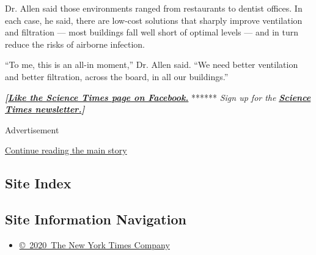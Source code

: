 Dr. Allen said those environments ranged from restaurants to dentist
offices. In each case, he said, there are low-cost solutions that
sharply improve ventilation and filtration --- most buildings fall well
short of optimal levels --- and in turn reduce the risks of airborne
infection.

``To me, this is an all-in moment,'' Dr. Allen said. ``We need better
ventilation and better filtration, across the board, in all our
buildings.''

\textbf{\emph{{[}}\href{http://on.fb.me/1paTQ1h}{\emph{Like the Science
Times page on Facebook.}}} ****** \emph{\textbar{} Sign up for the}
\textbf{\href{http://nyti.ms/1MbHaRU}{\emph{Science Times
newsletter.}}\emph{{]}}}

Advertisement

\protect\hyperlink{after-bottom}{Continue reading the main story}

\hypertarget{site-index}{%
\subsection{Site Index}\label{site-index}}

\hypertarget{site-information-navigation}{%
\subsection{Site Information
Navigation}\label{site-information-navigation}}

\begin{itemize}
\tightlist
\item
  \href{https://help.nytimes3xbfgragh.onion/hc/en-us/articles/115014792127-Copyright-notice}{©~2020~The
  New York Times Company}
\end{itemize}

